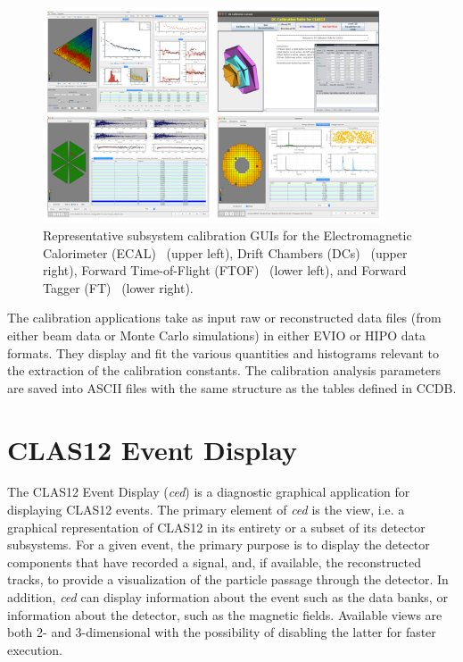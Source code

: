 \begin{figure}
\centering
\includegraphics[width=0.9\textwidth]{pics/suites.png}
\caption{Representative subsystem calibration GUIs for the Electromagnetic Calorimeter (ECAL)~\cite{ecal-nim}
  (upper left), Drift Chambers (DCs)~\cite{dc-nim} (upper right), Forward Time-of-Flight (FTOF)~\cite{ftof-nim}
  (lower left),  and Forward Tagger (FT)~\cite{ft-nim} (lower right).}
\label{suites}
\end{figure}

The calibration applications take as input raw or reconstructed data files (from either beam data or Monte Carlo
simulations) in either EVIO or HIPO data formats.  They display and fit the various quantities and histograms
relevant to the extraction of the calibration constants.  The calibration analysis parameters are saved into ASCII
files with the same structure as the tables defined in CCDB.

\section{CLAS12 Event Display}
\label{sec:ced}

The CLAS12 Event Display ({\it ced}) is a diagnostic graphical application for displaying CLAS12 events. The
primary element of {\it ced} is the view, i.e. a graphical representation of CLAS12 in its entirety or a subset of
its detector subsystems. For a given event, the primary purpose is to display the detector components that have
recorded a signal, and, if available, the reconstructed tracks, to provide a visualization of the particle passage
through the detector. In addition, {\it ced} can display information about the event such as the data banks, or
information about the detector, such as the magnetic fields. Available views are both 2- and 3-dimensional with
the possibility of disabling the latter for faster execution.

